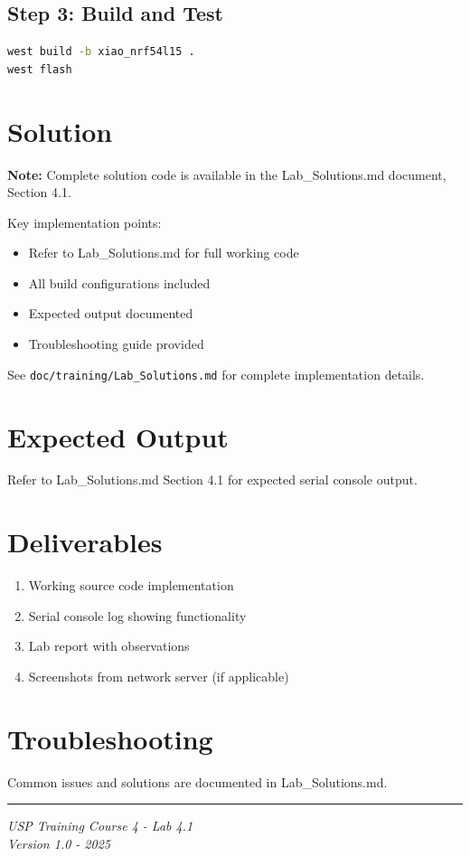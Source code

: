 \documentclass[11pt,a4paper]{article}
\begin{document}
\subsection{Step 3: Build and Test}
\begin{lstlisting}[language=bash]
west build -b xiao_nrf54l15 .
west flash
\end{lstlisting}

\section{Solution}

\begin{solutionbox}
\textbf{Note:} Complete solution code is available in the Lab\_Solutions.md document, Section 4.1.

Key implementation points:
\begin{itemize}
    \item Refer to Lab\_Solutions.md for full working code
    \item All build configurations included
    \item Expected output documented
    \item Troubleshooting guide provided
\end{itemize}

See \texttt{doc/training/Lab\_Solutions.md} for complete implementation details.
\end{solutionbox}

\section{Expected Output}

Refer to Lab\_Solutions.md Section 4.1 for expected serial console output.

\section{Deliverables}

\begin{enumerate}[itemsep=10pt]
    \item Working source code implementation
    \item Serial console log showing functionality
    \item Lab report with observations
    \item Screenshots from network server (if applicable)
\end{enumerate}

\section{Troubleshooting}

Common issues and solutions are documented in Lab\_Solutions.md.

\vfill
\noindent\rule{\textwidth}{0.4pt}
\begin{center}
\textit{USP Training Course 4 - Lab 4.1}\\
\textit{Version 1.0 - 2025}
\end{center}
\end{document}
